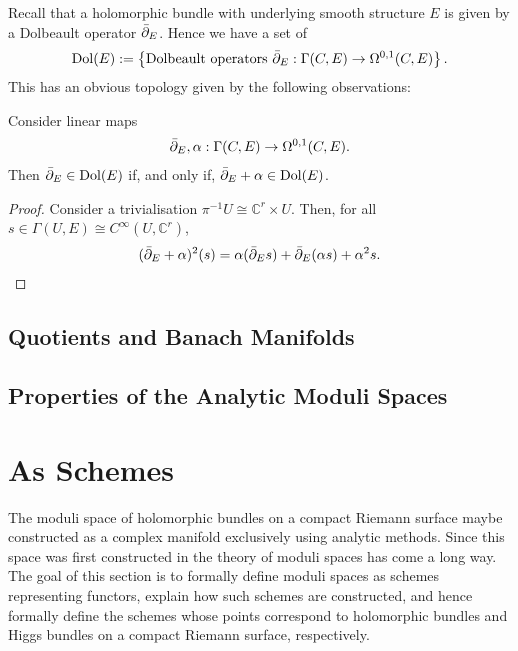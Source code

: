 \documentclass[12pt]{ociamthesis}  %
\begin{document}
Recall that a holomorphic bundle with underlying smooth structure $E$
is given by a Dolbeault operator $\bar{\partial}_E$. Hence we have a set of
\begin{align*}
  \operatorname{Dol}(E) := \left\lbrace{
      \text{Dolbeault operators $\bar{\partial}_E : \Gamma(C,E) \to \Omega^{0,1}(C,E)$}
  }\right\rbrace.
\end{align*}
This has an obvious topology given by the following observations:
\begin{lemma}
  Consider linear maps
  \begin{align*}
    \bar{\partial}_E,\alpha : \Gamma(C,E) \to \Omega^{0,1}(C,E).
  \end{align*}
  Then $\bar{\partial}_E\in\operatorname{Dol}(E)$ if, and only if, $\bar{\partial}_E+\alpha\in\operatorname{Dol}(E)$.
  \begin{proof}
    Consider a trivialisation ${\pi}^{-1}U \cong \mathbb{C}^r \times U$.
    Then, for all $s\in\Gamma(U,E)\cong C^\infty(U,\mathbb{C}^r)$,
    \begin{align*}
      (\bar{\partial}_E + \alpha)^2(s)
      = \alpha(\bar{\partial}_E s) + \bar{\partial}_E(\alpha s) + \alpha^2 s.
    \end{align*}
    \missingproof
  \end{proof}
\end{lemma}

\missingsection

\section{Quotients and Banach Manifolds}

\missingsection
\section{Properties of the Analytic Moduli Spaces}

\missingsection
\chapter{As Schemes}

The moduli space of holomorphic bundles on a compact Riemann
surface maybe constructed as a complex manifold exclusively
using analytic methods. Since this space was first constructed
in \missingcitation
the theory of moduli spaces has come a long way.
The goal of this section is to formally define moduli spaces
as schemes representing functors, explain how such schemes
are constructed, and hence formally define the schemes whose
points correspond to holomorphic bundles and Higgs bundles
on a compact Riemann surface, respectively.
\end{document}
